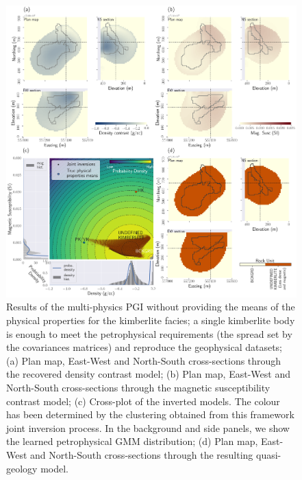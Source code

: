 \documentclass[extra, mreferee]{gji_joint} %
\begin{document}
\begin{figure}
    \centering
    \includegraphics[width=\textwidth]{Fig/LowRes/TKC_NoPrior_Synthetic.png}
    \caption{Results of the multi-physics PGI without providing the means of the physical properties for the kimberlite facies; a single kimberlite body is enough to meet the petrophysical requirements (the spread set by the covariances matrices) and reproduce the geophysical datasets; (a) Plan map, East-West and North-South cross-sections through the recovered density contrast model; (b) Plan map, East-West and North-South cross-sections through the magnetic susceptibility contrast model; (c) Cross-plot of the inverted models. The colour has been determined by the clustering obtained from this framework joint inversion process. In the background and side panels, we show the learned petrophysical GMM distribution; (d) Plan map, East-West and North-South cross-sections through the resulting quasi-geology model.}
    \label{fig:TKC_NoPrior_Synthetic.png}
\end{figure}
\end{document}
